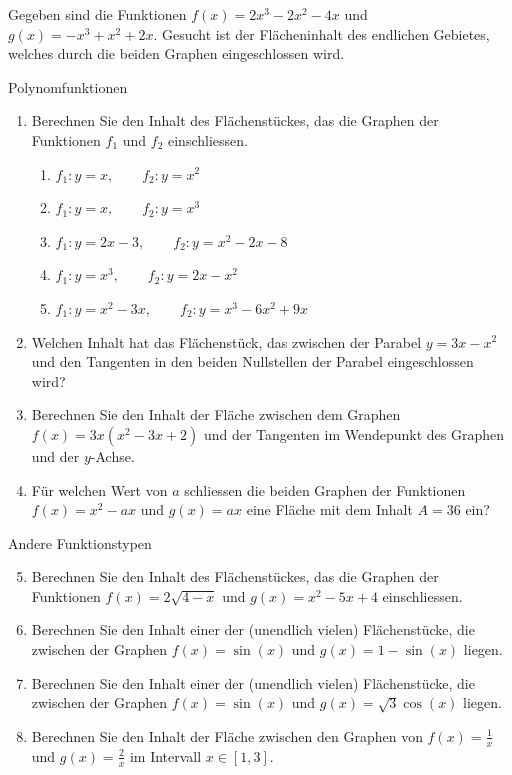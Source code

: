 \clearpage
\begin{bsp}
	{}{}
	Gegeben sind die Funktionen \(f(x)=2x^3-2x^2-4x\) und \(g(x)=-x^3+x^2+2x\). Gesucht ist der Flächeninhalt des endlichen Gebietes, welches durch die beiden Graphen eingeschlossen wird.
	\vspace{20cm}
\end{bsp}
\clearpage
\begin{ueb}
	{Polynomfunktionen}{}
	\begin{enumerate}
		\item Berechnen Sie den Inhalt des Flächenstückes, das die Graphen der Funktionen \(f_1\) und \(f_2\) einschliessen.
		      \begin{enumerate}
			      \item \(f_1: y=x,\qquad f_2: y=x^2\)
			      \item \(f_1: y=x,\qquad f_2: y=x^3\)
			      \item \(f_1: y=2x-3,\qquad f_2: y=x^2-2x-8\)
			      \item \(f_1: y=x^3,\qquad f_2: y=2x-x^2\)
			      \item \(f_1: y=x^2-3x,\qquad f_2: y=x^3-6x^2+9x\)
		      \end{enumerate}
		\item Welchen Inhalt hat das Flächenstück, das zwischen der Parabel \(y=3x-x^2\) und den Tangenten in den beiden Nullstellen der Parabel eingeschlossen wird?
		\item Berechnen Sie den Inhalt der Fläche zwischen dem Graphen \(f(x)= 3x(x^2-3x+2)\) und der Tangenten im Wendepunkt des Graphen und der \(y\)-Achse.
		\item Für welchen Wert von \(a\) schliessen die beiden Graphen der Funktionen \(f(x)=x^2-ax\) und \(g(x)= ax\) eine Fläche mit dem Inhalt \(A=36\) ein?
	\end{enumerate}
\end{ueb}
\begin{ueb}
	{Andere Funktionstypen}{}
	\begin{enumerate}\setcounter{enumi}{4}
		\item Berechnen Sie den Inhalt des Flächenstückes, das die Graphen der Funktionen \(f(x) = 2\sqrt{4-x}\) und \(g(x)=x^2-5x+4\) einschliessen.

		\item Berechnen Sie den Inhalt einer der (unendlich vielen) Flächenstücke, die zwischen der Graphen \(f(x)=\sin(x)\) und \(g(x)=1-\sin(x)\) liegen.
		\item Berechnen Sie den Inhalt einer der (unendlich vielen) Flächenstücke, die zwischen der Graphen \(f(x)=\sin(x)\) und \(g(x)=\sqrt{3}\cos(x)\) liegen.
		\item Berechnen Sie den Inhalt der Fläche zwischen den Graphen von \(f(x)=\frac{1}{x}\) und \(g(x) = \frac{2}{x}\) im Intervall \(x\in [1, 3]\).
	\end{enumerate}
\end{ueb}

